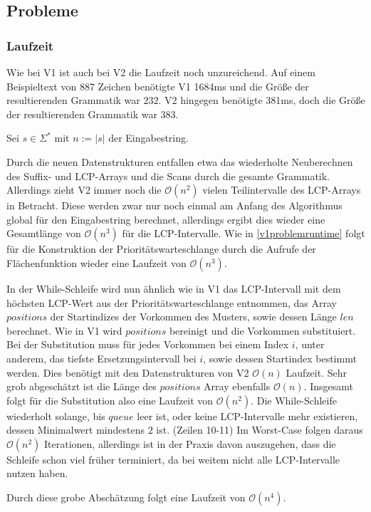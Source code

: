 \subsection{Probleme}

\subsubsection{Laufzeit}

Wie bei V1 ist auch bei V2 die Laufzeit noch unzureichend. Auf einem Beispieltext von $887$ Zeichen benötigte V1 1684ms und die Größe der resultierenden Grammatik war $232$. V2 hingegen benötigte 381ms, doch die Größe der resultierenden Grammatik war $383$. 

Sei $s \in \Sigma^*$ mit $n := |s|$ der Eingabestring.

Durch die neuen Datenstrukturen entfallen etwa das wiederholte Neuberechnen des Suffix- und LCP-Arrays und die Scans durch die gesamte Grammatik.
Allerdings zieht V2 immer noch die $\mathcal{O}(n^2)$ vielen Teilintervalle des LCP-Arrays in Betracht. Diese werden zwar nur noch einmal am Anfang des Algorithmus global für den Eingabestring berechnet, allerdings ergibt dies wieder eine Gesamtlänge von $\mathcal{O}(n^3)$ für die LCP-Intervalle. Wie in \autoref{v1problemruntime} folgt für die Konstruktion der Prioritätswarteschlange durch die Aufrufe der Flächenfunktion wieder eine Laufzeit von $\mathcal{O}(n^3)$.

In der While-Schleife wird nun ähnlich wie in V1 das LCP-Intervall mit dem höchsten LCP-Wert aus der Prioritätswarteschlange entnommen, das Array $positions$ der Startindizes der Vorkommen des Musters, sowie dessen Länge $len$ berechnet. 
Wie in V1 wird $positions$ bereinigt und die Vorkommen substituiert. Bei der Substitution muss für jedes Vorkommen bei einem Index $i$, unter anderem, das tiefste Ersetzungsintervall bei $i$, sowie dessen Startindex bestimmt werden. 
Dies benötigt mit den Datenstrukturen von V2 $\mathcal{O}(n)$ Laufzeit. Sehr grob abgeschätzt ist die Länge des $positions$ Array ebenfalls $\mathcal{O}(n)$. Insgesamt folgt für die Substitution also eine Laufzeit von $\mathcal{O}(n^2)$. Die While-Schleife wiederholt solange, bis $queue$ leer ist, oder keine LCP-Intervalle mehr existieren, dessen Minimalwert mindestens $2$ ist. (Zeilen 10-11) Im Worst-Case folgen daraus $\mathcal{O}(n^2)$ Iterationen, allerdings ist in der Praxis davon auszugehen, dass die Schleife schon viel früher terminiert, da bei weitem nicht alle LCP-Intervalle nutzen haben.

Durch diese grobe Abschätzung folgt eine Laufzeit von $\mathcal{O}(n^4)$.